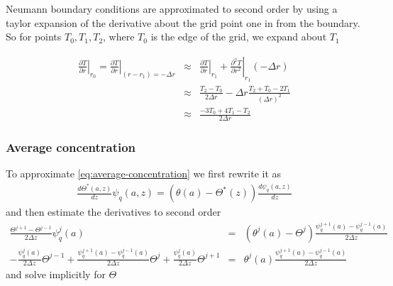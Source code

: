\documentclass{article}
\begin{document}
Neumann boundary conditions are approximated to second order by using a taylor expansion of the derivative about the grid point one in from the boundary. So for points $T_0, T_1, T_2$, where $T_0$ is the edge of the grid, we expand about $T_1$

\begin{eqnarray}
\left. \frac{\partial T}{\partial r} \right|_{r_0} = \left. \frac{\partial T}{\partial r} \right|_{(r-r_1) = - \Delta r} &\approx& \left. \frac{\partial T}{\partial r} \right|_{r_1} + \left. \frac{\partial^2 T}{\partial r^2} \right|_{r_1} (-\Delta r) \\
&\approx& \frac{T_2 - T_0}{2 \Delta r} - \Delta r \frac{T_2 + T_0 - 2 T_1}{(\Delta r)^2} \\
&\approx& \frac{-3 T_0 + 4 T_1 - T_2}{2 \Delta r}
\end{eqnarray}

\subsubsection{Average concentration}
To approximate \eqref{eq:average-concentration} we first rewrite it as 
\begin{eqnarray}
\frac{d \Theta^*(a, z)}{dz} \psi_q(a, z) = (\theta(a) - \Theta^*(z)) \frac{d \psi_q(a, z)}{dz}
\end{eqnarray}
and then estimate the derivatives to second order
\begin{eqnarray}
\frac{\Theta^{j+1} - \Theta^{j-1}}{2 \Delta z} \psi_q^j(a) &=& (\theta^j(a) - \Theta^j) \frac{\psi_q^{j+1}(a) - \psi_q^{j-1}(a)}{2 \Delta z} \\
- \frac{\psi_q^j(a)}{2 \Delta z} \Theta^{j-1} + \frac{\psi_q^{j+1}(a) - \psi_q^{j-1}(a) }{2 \Delta z} \Theta^j + \frac{\psi_q^j(a)}{2 \Delta z} \Theta^{j+1} &=& \theta^j(a) \frac{\psi_q^{j+1}(a) - \psi_q^{j-1}(a) }{2 \Delta z}
\end{eqnarray}
and solve implicitly for $\Theta$
\end{document}
